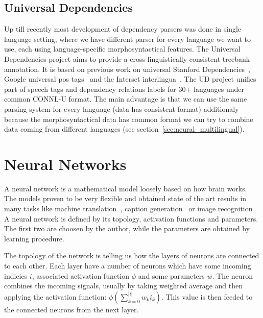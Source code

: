 \subsection{Universal Dependencies}
Up till recently most development of dependency parsers was done in single language
setting, where we have different parser for every language we want to use, each
using language-specific morphosyntactical features. The Universal Dependencies
project \cite{nivre_universal_2015} aims to provide a cross-linguistically consistent
treebank annotation. It is based on previous work on universal Stanford
Dependencies~\cite{marneffe_generating_2006},
Google universal pos tags~\cite{petrov_universal_2011}
and the Interset interlingua~\cite{zeman_reusable_2008}.
The UD project unifies part of speech tags and dependency relations labels
for 30+ languages under common CONNL-U format.
The main advantage is that we can use the same parsing system for every language
(data has consistent format) additionaly because the morphosyntactical data has
common format we can try to combine data coming from different languages (see
section~\ref{sec:neural_multilingual}).

\section{Neural Networks}
A neural network is a mathematical model loosely based on how brain works.
The models proven to be very flexible and obtained state of the art results in
many tasks like machine translation~\cite{bahdanau_neural_2014},
caption generation~\cite{xu_show_2015} or image recognition~\cite{szegedy_goglenet_2014}
A neural network is defined by its topology,
activation functions and parameters. The first two are choosen by the author,
while the parameters are obtained by learning procedure.

The topology of the network is telling us how the layers of neurons are connected
to each other. Each layer have a number of neurons which have some incoming
indicies $i$, associated activation function $\phi$ and some parameters $w$.
The neuron combines the incoming signals, usually by taking weighted average
and then applying the activation function: $ \phi ( \sum_{k=0}^{|i|} w_ki_k ) $.
This value is then feeded to the connected neurons from the next layer.

